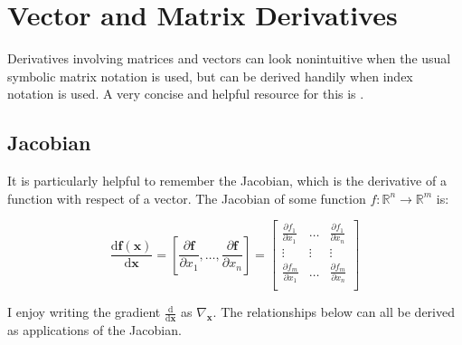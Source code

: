 \section{Vector and Matrix Derivatives}
\label{sec:derivatives}

Derivatives involving matrices and vectors can look nonintuitive when the usual symbolic matrix notation is used, but can be derived handily when index notation is used. A very concise and helpful resource for this is . 


\subsection{Jacobian}
It is particularly helpful to remember the Jacobian, which is the derivative of a function with respect of a vector. The Jacobian of some function $f: \mathbb{R}^n \rightarrow \mathbb{R}^m$ is:

\begin{equation}
\frac{\mathrm{d}  \mathbf{f}(\mathbf{x})}{\mathrm{d} \mathbf{x}}=\left[\frac{\partial \mathbf{f}}{\partial x_1}, \hdots, \frac{\partial \mathbf{f}}{\partial x_n} \right]=\left[\begin{array}{ccc}
\frac{\partial  f_1}{\partial  x_1} & \hdots & \frac{\partial  f_1}{\partial  x_n} \\
\vdots & \vdots & \vdots \\
\frac{\partial  f_m}{\partial  x_1} & \hdots & \frac{\partial  f_m}{\partial  x_n} \\
\end{array}\right]
\end{equation}

I enjoy writing the gradient $\frac{\mathrm{d}}{\mathrm{d}\mathbf{x}}$ as $\nabla_\mathbf{x}$. The relationships below can all be derived as applications of the Jacobian.

